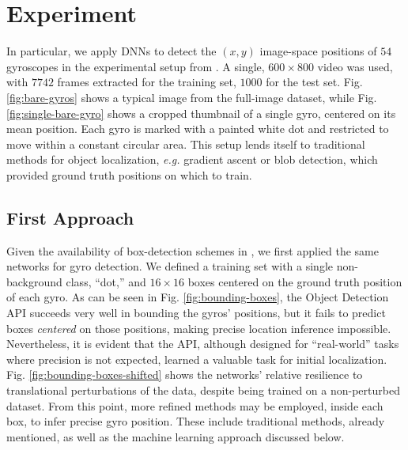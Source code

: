\documentclass[twocolumn, 10pt]{asme2ej}
\begin{document}
\section{Experiment}
\label{sec:experiment}

In particular, we apply DNNs to detect the $(x,y)$ image-space positions of $54$
gyroscopes in the experimental setup from \cite{nash_topological_2015}. A
single, $600\times 800$ video was used, with $7742$ frames extracted for the
training set, $1000$ for the test set. Fig. \ref{fig:bare-gyros} shows a typical
image from the full-image dataset, while Fig. \ref{fig:single-bare-gyro} shows a
cropped thumbnail of a single gyro, centered on its mean position. Each gyro is
marked with a painted white dot and restricted to move within a constant
circular area. This setup lends itself to traditional methods for object
localization, \emph{e.g.}  gradient ascent or blob detection, which provided
ground truth positions on which to train.

\subsection{First Approach}     %
\label{sec:first-approach}

Given the availability of box-detection schemes in
\cite{huang_speed/accuracy_2016}, we first applied the same networks for gyro
detection. We defined a training set with a single non-background class,
``dot,'' and $16 \times 16$ boxes centered on the ground truth position of each
gyro. As can be seen in Fig. \ref{fig:bounding-boxes}, the Object Detection API
succeeds very well in bounding the gyros' positions, but it fails to predict
boxes \emph{centered} on those positions, making precise location inference
impossible. Nevertheless, it is evident that the API, although designed for
``real-world'' tasks where precision is not expected, learned a valuable task
for initial localization. Fig. \ref{fig:bounding-boxes-shifted} shows the
networks' relative resilience to translational perturbations of the data,
despite being trained on a non-perturbed dataset. From this point, more refined
methods may be employed, inside each box, to infer precise gyro position. These
include traditional methods, already mentioned, as well as the machine learning
approach discussed below.
\end{document}
